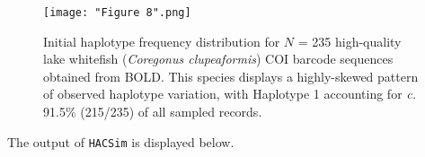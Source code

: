 \begin{figure}[H]

\centering

\texttt{[image: "Figure 8".png]}

\caption{Initial haplotype frequency distribution for $N$ = 235 high-quality lake whitefish (\textit{Coregonus clupeaformis}) COI barcode sequences obtained from BOLD. This species displays a highly-skewed pattern of observed haplotype variation, with Haplotype 1 accounting for \textit{c.} 91.5\% (215/235) of all sampled records.}

\end{figure}


\noindent The output of {\tt HACSim} is displayed below. 

\vspace{3mm}

